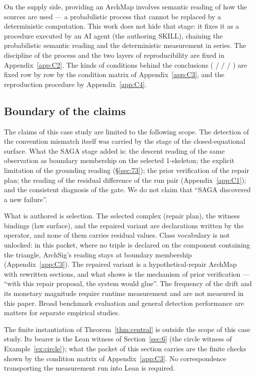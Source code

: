 On the supply side, providing an ArchMap involves semantic reading of
how the sources are used --- a probabilistic process that cannot be
replaced by a deterministic computation. This work does not hide that
stage: it fixes it as a procedure executed by an AI agent (the
authoring SKILL), chaining the probabilistic semantic reading and the
deterministic measurement in series. The discipline of the process and
the two layers of reproducibility are fixed in Appendix~\ref{app:C2}.
The kinds of conditions behind the conclusions ( /
 /  / ) are fixed row by
row by the condition matrix of Appendix~\ref{app:C3}, and the
reproduction procedure by Appendix~\ref{app:C4}.

\subsection{Boundary of the claims}\label{sec:75}

The claims of this case study are limited to the following scope. The
detection of the convention mismatch itself was carried by the stage
of the closed-equational surface. What the SAGA stage added is: the
descent reading of the same observation as boundary membership on the
selected 1-skeleton; the explicit limitation of the grounding reading
(\S\ref{sec:73}); the prior verification of the repair plan; the
reading of the residual difference of the run pair (Appendix~\ref{app:C1});
and the consistent diagnosis of the gate. We do not claim that ``SAGA
discovered a new failure''.

What is authored is selection. The selected complex (repair plan), the
witness bindings (law surface), and the repaired variant are
declarations written by the operator, and none of them carries
residual values. Class vocabulary is not unlocked: in this packet,
where no triple is declared on the component containing the triangle,
ArchSig's reading stays at boundary membership (Appendix~\ref{app:C3}). The
repaired variant is a hypothetical-repair ArchMap with rewritten
sections, and what  shows is the
mechanism of prior verification --- ``with this repair proposal, the
system would glue''. The frequency of the drift and its monetary
magnitude require runtime measurement and are not measured in this
paper. Broad benchmark evaluation and general detection performance
are matters for separate empirical studies.

The finite instantiation of Theorem~\ref{thm:central} is outside the
scope of this case study. Its bearer is the Lean witness of
Section~\ref{sec:6} (the circle witness of Example~\ref{ex:circle});
what the packet of this section carries are the finite checks shown by
the condition matrix of Appendix~\ref{app:C3}. No correspondence transporting
the measurement run into Lean is required.

